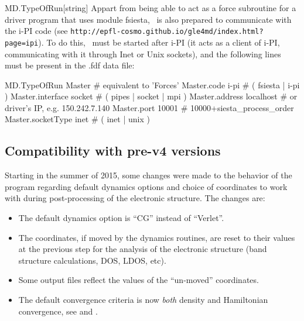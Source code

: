 \begin{fdfentry}{MD.TypeOfRun}[string]
  Appart from being able to act as a force subroutine for a driver
  program that uses module fsiesta, \siesta\ is also prepared to
  communicate with the i-PI code (see
  \texttt{http://epfl-cosmo.github.io/gle4md/index.html?page=ipi}).
  To do this, \siesta\ must be started after i-PI (it acts as a client
  of i-PI, communicating with it through Inet or Unix sockets), and
  the following lines must be present in the .fdf data file:
  \begin{fdfexample}
     MD.TypeOfRun      Master     # equivalent to 'Forces'
     Master.code       i-pi       # ( fsiesta | i-pi )
     Master.interface  socket     # ( pipes | socket | mpi )
     Master.address    localhost  # or driver's IP, e.g. 150.242.7.140
     Master.port       10001      # 10000+siesta_process_order
     Master.socketType inet       # ( inet | unix )
  \end{fdfexample}

\end{fdfentry}



\subsection{Compatibility with pre-v4 versions}

Starting in the summer of 2015, some changes were made to the behavior
of the program regarding default dynamics options and choice of
coordinates to work with during post-processing of the electronic
structure. The changes are:

\begin{itemize}
  \item %
  The default dynamics option is ``CG'' instead of ``Verlet''.

  \item%
  The coordinates, if moved by the dynamics routines, are reset to
  their values at the previous step for the analysis of the electronic 
  structure (band structure calculations, DOS, LDOS, etc).

  \item%
  Some output files reflect the values of the ``un-moved''
  coordinates.

  \item%
  The default convergence criteria is now \emph{both} density and
  Hamiltonian convergence, see  and
  .

\end{itemize}

